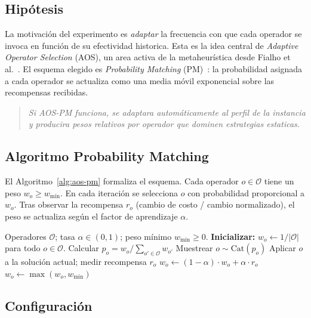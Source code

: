 \subsection{Hipótesis}

La motivación del experimento es \emph{adaptar} la frecuencia con que
cada operador se invoca en función de su efectividad historica. Esta es
la idea central de \emph{Adaptive Operator Selection} (AOS), un area
activa de la metaheurística desde Fialho et al.~\cite{fialho2008}. El esquema
elegido es \emph{Probability Matching} (PM)~\cite{thierens2005}: la probabilidad asignada a
cada operador se actualiza como una media móvil exponencial sobre las
recompensas recibidas.

\begin{quote}
\textit{Si AOS-PM funciona, se adaptara automáticamente al perfil de la
instancia y producira pesos relativos por operador que dominen
estrategias estaticas.}
\end{quote}

\subsection{Algoritmo Probability Matching}

El Algoritmo~\ref{alg:aos-pm} formaliza el esquema. Cada operador
$o \in \mathcal{O}$ tiene un peso $w_o \ge w_{\min}$. En cada iteración
se selecciona $o$ con probabilidad proporcional a $w_o$. Tras observar
la recompensa $r_o$ (cambio de costo / cambio normalizado), el peso se
actualiza según el factor de aprendizaje $\alpha$.

\begin{algorithm}[h]
\caption{AOS Probability Matching.}
\label{alg:aos-pm}
\begin{algorithmic}[1]
\Require Operadores $\mathcal{O}$; tasa $\alpha \in (0,1)$; peso mínimo $w_{\min} \ge 0$.
\State \textbf{Inicializar:} $w_o \gets 1 / |\mathcal{O}|$ para todo $o \in \mathcal{O}$.
  \State Calcular $p_o = w_o / \sum_{o' \in \mathcal{O}} w_{o'}$
  \State Muestrear $o \sim \text{Cat}(p_o)$
  \State Aplicar $o$ a la solución actual; medir recompensa $r_o$
  \State $w_o \gets (1-\alpha) \cdot w_o + \alpha \cdot r_o$
  \State $w_o \gets \max(w_o, w_{\min})$ 
\EndFor
\end{algorithmic}
\end{algorithm}

\subsection{Configuración}

